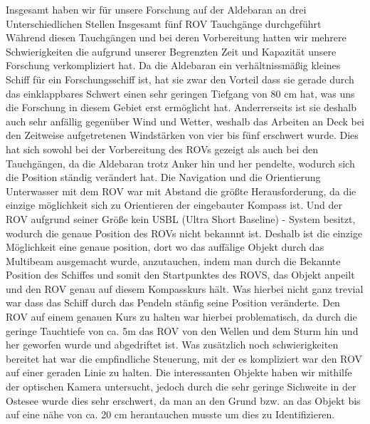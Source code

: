 Insgesamt haben wir für unsere Forschung auf der Aldebaran an drei Unterschiedlichen Stellen Insgesamt fünf ROV Tauchgänge durchgeführt 
Während diesen Tauchgängen und bei deren Vorbereitung hatten wir mehrere Schwierigkeiten die aufgrund unserer Begrenzten Zeit und Kapazität unsere Forschung verkompliziert hat.
Da die Aldebaran ein verhältnissmäßig kleines Schiff für ein Forschungsschiff ist, hat sie zwar den Vorteil dass sie gerade durch das einklappbares Schwert einen sehr geringen Tiefgang von 80 cm hat, was uns die Forschung in diesem Gebiet erst ermöglicht hat.
Anderrerseits ist sie deshalb auch sehr anfällig gegenüber Wind und Wetter, weshalb das Arbeiten an Deck bei den Zeitweise aufgetretenen Windstärken von vier bis fünf erschwert wurde.
Dies hat sich sowohl bei der Vorbereitung des ROVs gezeigt als auch bei den Tauchgängen, da die Aldebaran trotz Anker hin und her pendelte, wodurch sich die Position ständig verändert hat.
Die Navigation und die Orientierung Unterwasser mit dem ROV war mit Abstand die größte Herausforderung, da die einzige möglichkeit sich zu Orientieren der eingebauter Kompass ist.
Und der ROV aufgrund seiner Größe kein USBL (Ultra Short Baseline) - System besitzt, wodurch die genaue Position des ROVs nicht bekannnt ist.
Deshalb ist die einzige Möglichkeit eine genaue position, dort wo das auffälige Objekt durch das Multibeam ausgemacht wurde, anzutauchen, indem man durch die Bekannte Position des Schiffes und somit den Startpunktes des ROVS, das Objekt anpeilt und den ROV genau auf diesem Kompasskurs hält.
Was hierbei nicht ganz trevial war dass das Schiff durch das Pendeln stänfig seine Position veränderte.
Den ROV auf einem genauen Kurs zu halten war hierbei problematisch, da durch die geringe Tauchtiefe von ca. 5m das ROV von den Wellen und dem Sturm hin und her geworfen wurde und abgedriftet ist.
Was zusätzlich noch schwierigkeiten bereitet hat war die empfindliche Steuerung, mit der es kompliziert war den ROV auf einer geraden Linie zu halten.
Die interessanten Objekte haben wir mithilfe der optischen Kamera untersucht, jedoch durch die sehr geringe Sichweite in der Ostesee wurde dies sehr erschwert, da man an den Grund bzw. an das Objekt bis auf eine nähe von ca. 20 cm herantauchen musste um dies zu Identifizieren. 
\\

